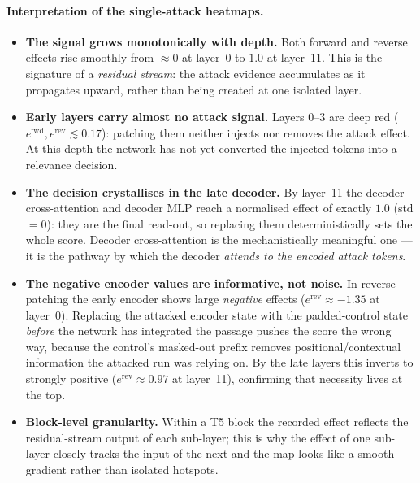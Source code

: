 \documentclass[11pt]{article}
\newcommand{\fwd}{\ensuremath{e^{\mathrm{fwd}}}}
\newcommand{\rev}{\ensuremath{e^{\mathrm{rev}}}}
\begin{document}
\paragraph{Interpretation of the single-attack heatmaps.}
\begin{itemize}
  \item \textbf{The signal grows monotonically with depth.} Both forward and
        reverse effects rise smoothly from $\approx0$ at layer~0 to $1.0$ at
        layer~11. This is the signature of a \emph{residual stream}: the attack
        evidence accumulates as it propagates upward, rather than being created
        at one isolated layer.
  \item \textbf{Early layers carry almost no attack signal.} Layers 0--3 are
        deep red ($\fwd,\rev \lesssim 0.17$): patching them neither injects nor
        removes the attack effect. At this depth the network has not yet
        converted the injected tokens into a relevance decision.
  \item \textbf{The decision crystallises in the late decoder.} By layer~11 the
        decoder cross-attention and decoder MLP reach a normalised effect of
        exactly $1.0$ (std $=0$): they are the final read-out, so replacing them
        deterministically sets the whole score. Decoder cross-attention is the
        mechanistically meaningful one — it is the pathway by which the decoder
        \emph{attends to the encoded attack tokens}.
  \item \textbf{The negative encoder values are informative, not noise.} In
        reverse patching the early encoder shows large \emph{negative} effects
        ($\rev \approx -1.35$ at layer~0). Replacing the attacked encoder state
        with the padded-control state \emph{before} the network has integrated
        the passage pushes the score the wrong way, because the control's
        masked-out prefix removes positional/contextual information the attacked
        run was relying on. By the late layers this inverts to strongly positive
        ($\rev\approx0.97$ at layer~11), confirming that necessity lives at the top.
  \item \textbf{Block-level granularity.} Within a T5 block the recorded effect
        reflects the residual-stream output of each sub-layer; this is why the
        effect of one sub-layer closely tracks the input of the next and the map
        looks like a smooth gradient rather than isolated hotspots.
\end{itemize}
\end{document}
